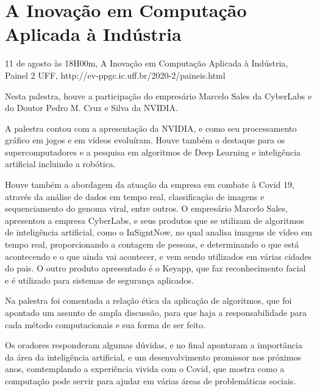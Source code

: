 \section{A Inovação em Computação Aplicada à Indústria}

\begin{center}
  \vspace{1cm}
  11 de agosto às 18H00m, A Inovação em Computação Aplicada à Indústria, Painel 2 UFF, http://ev-ppgc.ic.uff.br/2020-2/paineis.html
  \vspace{1cm}
\end{center}

Nesta palestra, houve a participação do empresário Marcelo Sales da CyberLabs e do Doutor Pedro M. Cruz e Silva da NVIDIA.

A palestra contou com a apresentação da NVIDIA, e como seu processamento gráfico em jogos e em vídeos evoluíram. Houve também o destaque para os supercomputadores e a pesquisa em algoritmos de Deep Learning e inteligência artificial incluindo a robótica.

Houve também a abordagem da atuação da empresa em combate à Covid 19, através da análise de dados em tempo real, classificação de imagens e sequenciamento do genoma viral, entre outros. 
O empresário Marcelo Sales, apresentou a empresa CyberLabs, e seus produtos que se utilizam de algoritmos de inteligência artificial, como o InSigntNow, no qual analisa imagens de vídeo em tempo real, proporcionando a contagem de pessoas, e determinando o que está acontecendo e o que ainda vai acontecer, e vem sendo utilizados em várias cidades do pais. 
O outro produto apresentado é o Keyapp, que faz reconhecimento facial e é utilizado para sistemas de segurança aplicados. 

Na palestra foi comentada a relação ética da aplicação de algoritmos, que foi apontado um assunto de ampla discussão, para que haja a responsabilidade para cada método computacionais e sua forma de ser feito.

Os oradores responderam algumas dúvidas, e no final apontaram a importância da área da inteligência artificial, e um desenvolvimento promissor nos próximos anos, comtemplando a experiência vivida com o Covid, que mostra como a computação pode servir para ajudar em várias áreas de problemáticas sociais.